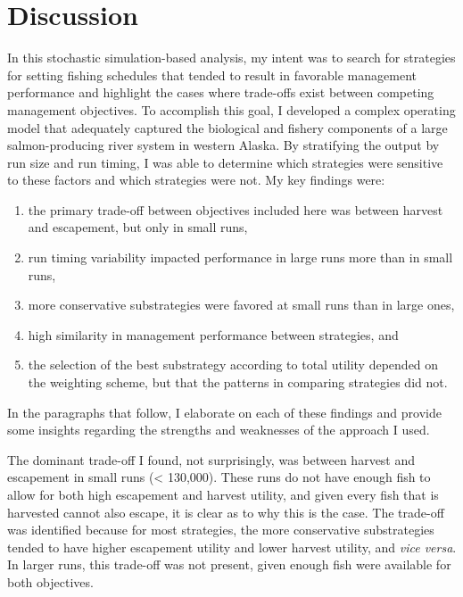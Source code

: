 \documentclass[12pt,]{book}
\theoremstyle{definition}
\theoremstyle{definition}
\theoremstyle{definition}
\theoremstyle{remark}
\begin{document}
\section{Discussion}\label{discussion}

\noindent
In this stochastic simulation-based analysis, my intent was to search
for strategies for setting fishing schedules that tended to result in
favorable management performance and highlight the cases where
trade-offs exist between competing management objectives. To accomplish
this goal, I developed a complex operating model that adequately
captured the biological and fishery components of a large
salmon-producing river system in western Alaska. By stratifying the
output by run size and run timing, I was able to determine which
strategies were sensitive to these factors and which strategies were
not. My key findings were:

\begin{enumerate}
\def\labelenumi{(\arabic{enumi})}
\item
  the primary trade-off between objectives included here was between
  harvest and escapement, but only in small runs,
\item
  run timing variability impacted performance in large runs more than in
  small runs,
\item
  more conservative substrategies were favored at small runs than in
  large ones,
\item
  high similarity in management performance between strategies, and
\item
  the selection of the best substrategy according to total utility
  depended on the weighting scheme, but that the patterns in comparing
  strategies did not.
\end{enumerate}

\noindent
In the paragraphs that follow, I elaborate on each of these findings and
provide some insights regarding the strengths and weaknesses of the
approach I used.

The dominant trade-off I found, not surprisingly, was between harvest
and escapement in small runs (\textless{} 130,000). These runs do not
have enough fish to allow for both high escapement and harvest utility,
and given every fish that is harvested cannot also escape, it is clear
as to why this is the case. The trade-off was identified because for
most strategies, the more conservative substrategies tended to have
higher escapement utility and lower harvest utility, and \emph{vice
versa}. In larger runs, this trade-off was not present, given enough
fish were available for both objectives.
\end{document}
